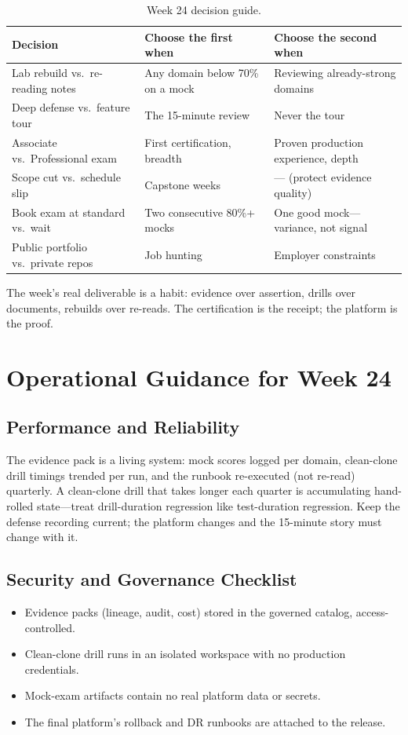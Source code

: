 \begin{table}[H]
\centering
\small
\begin{tabular}{@{}p{3.4cm}p{4.4cm}p{4.6cm}@{}}
\toprule
\textbf{Decision} & \textbf{Choose the first when} & \textbf{Choose the second when} \\
\midrule
Lab rebuild vs.\ re-reading notes & Any domain below 70\% on a mock & Reviewing already-strong domains \\
Deep defense vs.\ feature tour & The 15-minute review & Never the tour \\
Associate vs.\ Professional exam & First certification, breadth & Proven production experience, depth \\
Scope cut vs.\ schedule slip & Capstone weeks & --- (protect evidence quality) \\
Book exam at standard vs.\ wait & Two consecutive 80\%+ mocks & One good mock---variance, not signal \\
Public portfolio vs.\ private repos & Job hunting & Employer constraints \\
\bottomrule
\end{tabular}
\caption{Week 24 decision guide.}
\label{tab:ch24-decisions}
\end{table}

The week's real deliverable is a habit: evidence over assertion, drills over documents, rebuilds over re-reads. The certification is the receipt; the platform is the proof.

\section{Operational Guidance for Week 24}
%
\subsection{Performance and Reliability}
The evidence pack is a living system: mock scores logged per domain, clean-clone drill timings trended per run, and the runbook re-executed (not re-read) quarterly. A clean-clone drill that takes longer each quarter is accumulating hand-rolled state---treat drill-duration regression like test-duration regression. Keep the defense recording current; the platform changes and the 15-minute story must change with it.

\subsection{Security and Governance Checklist}
\begin{itemize}
    \item Evidence packs (lineage, audit, cost) stored in the governed catalog, access-controlled.
    \item Clean-clone drill runs in an isolated workspace with no production credentials.
    \item Mock-exam artifacts contain no real platform data or secrets.
    \item The final platform's rollback and DR runbooks are attached to the release.
\end{itemize}

